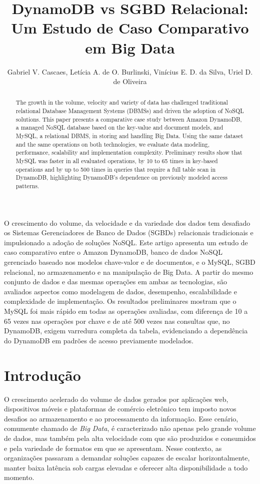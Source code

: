 \documentclass[12pt]{article}
\title{DynamoDB vs SGBD Relacional: Um Estudo de Caso Comparativo em Big Data}
\author{Gabriel V. Cascaes\inst{1}, Letícia A. de O. Burlinski\inst{1},
  Vinícius E. D. da Silva\inst{1}, Uriel D. de Oliveira\inst{1}}
\begin{document}
\maketitle

\begin{abstract}
The growth in the volume, velocity and variety of data has challenged
traditional relational Database Management Systems (DBMSs) and driven the
adoption of NoSQL solutions. This paper presents a comparative case study
between Amazon DynamoDB, a managed NoSQL database based on the key-value and
document models, and MySQL, a relational DBMS, in storing and handling Big
Data. Using the same dataset and the same operations on both technologies, we
evaluate data modeling, performance, scalability and implementation
complexity. Preliminary results show that MySQL was faster in all evaluated
operations, by 10 to 65 times in key-based operations and by up to 500 times
in queries that require a full table scan in DynamoDB, highlighting
DynamoDB's dependence on previously modeled access patterns.
\end{abstract}

\begin{resumo}
O crescimento do volume, da velocidade e da variedade dos dados tem desafiado
os Sistemas Gerenciadores de Banco de Dados (SGBDs) relacionais tradicionais e
impulsionado a adoção de soluções NoSQL. Este artigo apresenta um estudo de
caso comparativo entre o Amazon DynamoDB, banco de dados NoSQL gerenciado
baseado nos modelos chave-valor e de documentos, e o MySQL, SGBD relacional,
no armazenamento e na manipulação de Big Data. A partir do mesmo conjunto de
dados e das mesmas operações em ambas as tecnologias, são avaliados aspectos
como modelagem de dados, desempenho, escalabilidade e complexidade de
implementação. Os resultados preliminares mostram que o MySQL foi mais rápido
em todas as operações avaliadas, com diferença de 10 a 65 vezes nas operações
por chave e de até 500 vezes nas consultas que, no DynamoDB, exigem varredura
completa da tabela, evidenciando a dependência do DynamoDB em padrões de
acesso previamente modelados.
\end{resumo}

\section{Introdução}

O crescimento acelerado do volume de dados gerados por aplicações web,
dispositivos móveis e plataformas de comércio eletrônico tem imposto
novos desafios ao armazenamento e ao processamento da informação. Esse
cenário, comumente chamado de \textit{Big Data}, é caracterizado não apenas
pelo grande volume de dados, mas também pela alta velocidade com que são
produzidos e consumidos e pela variedade de formatos em que se apresentam.
Nesse contexto, as organizações passaram a demandar soluções capazes de
escalar horizontalmente, manter baixa latência sob cargas elevadas e oferecer
alta disponibilidade a todo momento.
\end{document}

